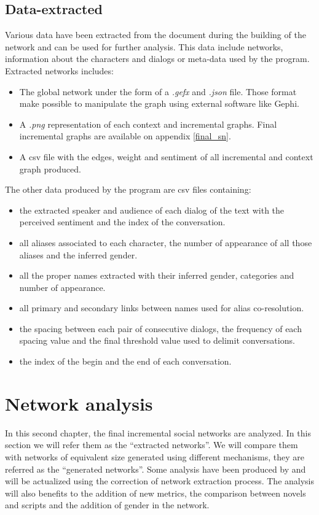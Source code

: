 \documentclass[a4paper, 12pt]{report}
\begin{document}
\newpage
\section{Data-extracted}
Various data have been extracted from the document during the building of the network and can be used for further analysis. This data include networks, information about the characters and dialogs or meta-data used by the program.
Extracted networks includes:
\begin{itemize}
\item The global network under the form of a \textit{.gefx} and \textit{.json} file. Those format make possible to manipulate the graph using external software like Gephi.
\item A \textit{.png} representation of each context and incremental graphs. Final incremental graphs are available on appendix \ref{final_sn}.
\item A csv file with the edges, weight and sentiment of all incremental and context graph produced.
\end{itemize}

The other data produced by the program are csv files containing:
\begin{itemize}
\item the extracted speaker and audience of each dialog of the text with the perceived sentiment and the index of the conversation.
\item all aliases associated to each character, the number of appearance of all those aliases and the inferred gender.
\item all the proper names extracted with their inferred gender, categories and number of appearance.
\item all primary and secondary links between names used for alias co-resolution.
\item the spacing between each pair of consecutive dialogs, the frequency of each spacing value and the final threshold value used to delimit conversations.
\item the index of the begin and the end of each conversation.
\end{itemize}









\chapter{Network analysis}
In this second chapter, the final incremental social networks are analyzed. In this section we will refer them as the ``extracted networks''. 
We will compare them with networks of equivalent size generated using different mechanisms, they are referred as the ``generated networks''.
Some analysis have been produced by \cite{original} and will be actualized using the correction of network extraction process. 
The analysis will also benefits to the addition of new metrics, the comparison between novels and scripts and the addition of gender in the network.
\end{document}
